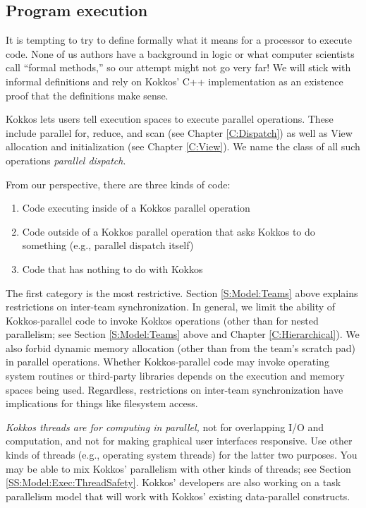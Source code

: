 \subsection{Program execution}\label{S:Model:Exec}

It is tempting to try to define formally what it means for a processor to execute code.
None of us authors have a background in logic or what computer scientists call ``formal methods,''
so our attempt might not go very far!
We will stick with informal definitions and rely on Kokkos' C++ implementation
as an existence proof that the definitions make sense.

Kokkos lets users tell execution spaces to execute parallel operations.
These include parallel for, reduce, and scan (see Chapter \ref{C:Dispatch})
as well as View allocation and initialization (see Chapter \ref{C:View}).
We name the class of all such operations \emph{parallel dispatch}.

From our perspective, there are three kinds of code:
\begin{enumerate}
\item Code executing inside of a Kokkos parallel operation
\item Code outside of a Kokkos parallel operation that asks Kokkos to
  do something (e.g., parallel dispatch itself)
\item Code that has nothing to do with Kokkos
\end{enumerate}
The first category is the most restrictive.
Section \ref{S:Model:Teams} above explains restrictions on inter-team synchronization.
In general, we limit the ability of Kokkos-parallel code to invoke Kokkos operations
(other than for nested parallelism; 
see Section \ref{S:Model:Teams} above and Chapter \ref{C:Hierarchical}).
We also forbid dynamic memory allocation (other than from the team's scratch pad) in parallel operations.
Whether Kokkos-parallel code may invoke operating system routines or third-party libraries
depends on the execution and memory spaces being used.
Regardless, restrictions on inter-team synchronization have implications for things like filesystem access.

\emph{Kokkos threads are for computing in parallel,}
not for overlapping I/O and computation,
and not for making graphical user interfaces responsive.
Use other kinds of threads (e.g., operating system threads) for the latter two purposes.
You may be able to mix Kokkos' parallelism with other kinds of threads;
see Section \ref{SS:Model:Exec:ThreadSafety}.
Kokkos' developers are also working on a task parallelism model
that will work with Kokkos' existing data-parallel constructs.

